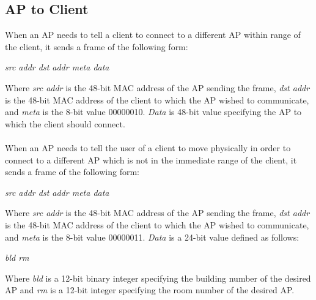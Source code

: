 \documentclass[10pt,journal,compsoc]{IEEEtran}
\begin{document}
		\subsection{AP to Client}
		When an AP needs to tell a client to connect to a different AP within range of the client, it sends a frame of the following form:
		\begin{center}\textit{ src addr \textbar dst addr \textbar meta \textbar data  }\end{center}
		Where \textit{src addr} is the 48-bit MAC address of the AP sending the frame, \textit{dst addr} is the 48-bit MAC address of the client to which the AP wished to communicate, and \textit{meta} is the 8-bit value 00000010. \textit{Data} is 48-bit value specifying the AP to which the client should connect.\\
		\\
		When an AP needs to tell the user of a client to move physically in order to connect to a different AP which is not in the immediate range of the client, it sends a frame of the following form:
		\begin{center}\textit{ src addr \textbar dst addr \textbar meta \textbar data  }\end{center}
		Where \textit{src addr} is the 48-bit MAC address of the AP sending the frame, \textit{dst addr} is the 48-bit MAC address of the client to which the AP wished to communicate, and \textit{meta} is the 8-bit value 00000011. \textit{Data} is a 24-bit value defined as follows:
		\begin{center}\textit{bld \textbar rm}\end{center}
		Where \textit{bld} is a 12-bit binary integer specifying the building number of the desired AP and \textit{rm} is a 12-bit integer specifying the room number of the desired AP.
		
\end{document}
